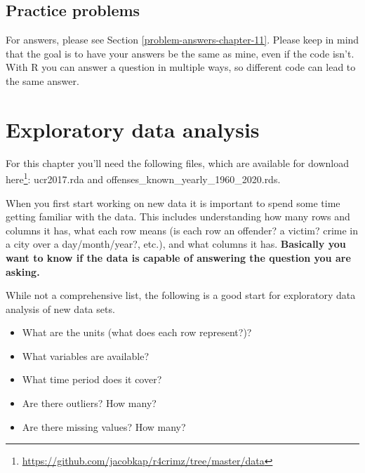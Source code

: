 \documentclass[
]{krantz}
\makeatletter
\newenvironment{Shaded}{\begin{snugshade}}{\end{snugshade}}
\newcommand{\CommentTok}[1]{\textcolor[rgb]{0.37,0.37,0.37}{\textit{#1}}}
\newcommand{\FunctionTok}[1]{\textcolor[rgb]{0,0,0}{#1}}
\newcommand{\NormalTok}[1]{#1}
\newcommand{\SpecialCharTok}[1]{\textcolor[rgb]{0,0,0}{#1}}
\providecommand{\tightlist}{%
  \setlength{\itemsep}{0pt}\setlength{\parskip}{0pt}}
\renewcommand{\href}[2]{#2\footnote{\url{#1}}}
\newenvironment{kframe}{%
\medskip{}
\setlength{\fboxsep}{.8em}
 \def\at@end@of@kframe{}%
 \ifinner\ifhmode%
  \def\at@end@of@kframe{\end{minipage}}%
  \begin{minipage}{\columnwidth}%
 \fi\fi%
 \def\FrameCommand##1{\hskip\@totalleftmargin \hskip-\fboxsep
 \colorbox{shadecolor}{##1}\hskip-\fboxsep
     \hskip-\linewidth \hskip-\@totalleftmargin \hskip\columnwidth}%
 \MakeFramed {\advance\hsize-\width
   \@totalleftmargin\z@ \linewidth\hsize
   \@setminipage}}%
 {\par\unskip\endMakeFramed%
 \at@end@of@kframe}
\renewenvironment{Shaded}{\begin{kframe}}{\end{kframe}}
\makeatother
\begin{document}
\begin{Shaded}
\end{Shaded}

\hypertarget{practice-problems-4}{%
\section{Practice problems}\label{practice-problems-4}}

For answers, please see Section \ref{problem-answers-chapter-11}. Please keep in mind that the goal is to have your answers be the same as mine, even if the code isn't. With R you can answer a question in multiple ways, so different code can lead to the same answer.

\hypertarget{explore}{%
\chapter{Exploratory data analysis}\label{explore}}

For this chapter you'll need the following files, which are available for download \href{https://github.com/jacobkap/r4crimz/tree/master/data}{here}: ucr2017.rda and offenses\_known\_yearly\_1960\_2020.rds.

When you first start working on new data it is important to spend some time getting familiar with the data. This includes understanding how many rows and columns it has, what each row means (is each row an offender? a victim? crime in a city over a day/month/year?, etc.), and what columns it has. \textbf{Basically you want to know if the data is capable of answering the question you are asking.}

While not a comprehensive list, the following is a good start for exploratory data analysis of new data sets.

\begin{itemize}
\tightlist
\item
  What are the units (what does each row represent?)?
\item
  What variables are available?
\item
  What time period does it cover?
\item
  Are there outliers? How many?
\item
  Are there missing values? How many?
\end{itemize}
\end{document}
